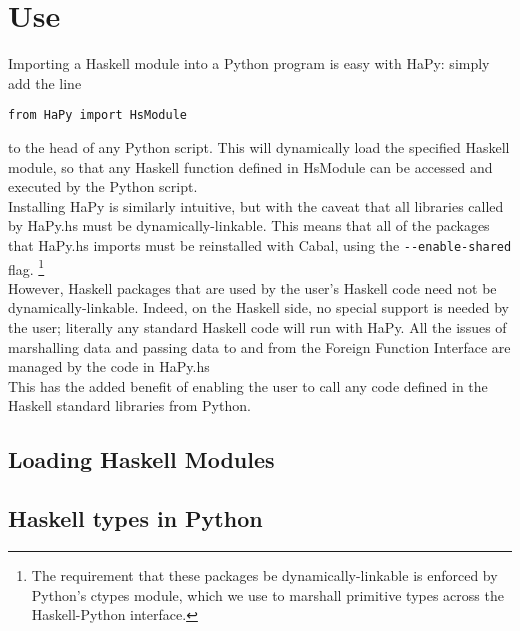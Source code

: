 \documentclass[11pt, letterpaper, oneside, twocolumn] {article}
\begin{document}
\section{Use}
Importing a Haskell module into a Python program is easy with HaPy: simply add the line
\begin{verbatim}
from HaPy import HsModule
\end{verbatim}
to the head of any Python script. This will dynamically load the specified Haskell module, so that any Haskell function defined in HsModule can be accessed and executed by the Python script. \\
Installing HaPy is similarly intuitive, but with the caveat that all libraries called by HaPy.hs must be dynamically-linkable. This means that all of the packages that HaPy.hs imports must be reinstalled with Cabal, using the \verb!--enable-shared! flag. \footnote{The requirement that these packages be dynamically-linkable is enforced by Python's ctypes module, which we use to marshall primitive types across the Haskell-Python interface.} \\
However, Haskell packages that are used by the user's Haskell code need not be dynamically-linkable. Indeed, on the Haskell side, no special support is needed by the user; literally any standard Haskell code will run with HaPy. All the issues of marshalling data and passing data to and from the Foreign Function Interface are managed by the code in HaPy.hs \\
This has the added benefit of enabling the user to call any code defined in the Haskell standard libraries from Python. 

\subsection{Loading Haskell Modules}

\subsection{Haskell types in Python}
\end{document}
